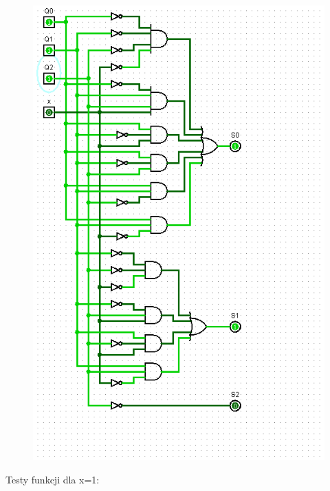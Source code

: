 \documentclass[]{article}
\begin{document}
\begin{minipage}{0.5\textwidth}
\begin{figure}[H]
	\centering
	\includegraphics[width=1\textwidth]{test0_7.png}
\end{figure}
\end{minipage}
\newpage
Testy funkcji dla x=1:
\newline
\end{document}
